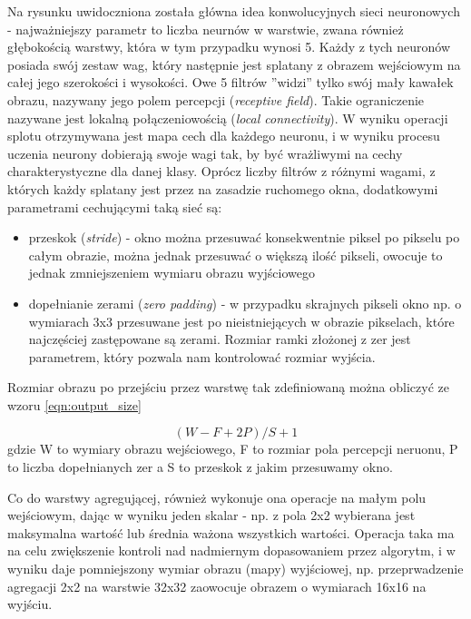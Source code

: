 Na rysunku uwidoczniona została główna idea konwolucyjnych sieci neuronowych - najważniejszy parametr to liczba neurnów w warstwie, zwana również głębokością warstwy, która w tym przypadku wynosi 5.
Każdy z tych neuronów posiada swój zestaw wag, który następnie jest splatany z obrazem wejściowym na całej jego szerokości i wysokości.
Owe 5 filtrów ''widzi'' tylko swój mały kawałek obrazu, nazywany jego polem percepcji (\textit{receptive field}).
Takie ograniczenie nazywane jest lokalną połączeniowością (\textit{local connectivity}).
W wyniku operacji splotu otrzymywana jest mapa cech dla każdego neuronu, i w wyniku procesu uczenia neurony dobierają swoje wagi tak, by być wrażliwymi na cechy charakterystyczne dla danej klasy.
Oprócz liczby filtrów z różnymi wagami, z których każdy splatany jest przez na zasadzie ruchomego okna, dodatkowymi parametrami cechującymi taką sieć są:

\begin{itemize}
	\item przeskok (\textit{stride}) - okno można przesuwać konsekwentnie piksel po pikselu po całym obrazie, można jednak przesuwać o większą ilość pikseli, owocuje to jednak zmniejszeniem wymiaru obrazu wyjściowego
	\item dopełnianie zerami (\textit{zero padding}) - w przypadku skrajnych pikseli okno np. o wymiarach 3x3 przesuwane jest po nieistniejących w obrazie pikselach, które najczęściej zastępowane są zerami.
	 			Rozmiar ramki złożonej z zer jest parametrem, który pozwala nam kontrolować rozmiar wyjścia.
\end{itemize}

Rozmiar obrazu po przejściu przez warstwę tak zdefiniowaną można obliczyć ze wzoru \ref{eqn:output_size}

\begin{equation}\label{eqn:output_size}
(W - F + 2P)/S + 1
\end{equation}
gdzie W to wymiary obrazu wejściowego, F to rozmiar pola percepcji neruonu, P to liczba dopełnianych zer a S to przeskok z jakim przesuwamy okno.

Co do warstwy agregującej, również wykonuje ona operacje na małym polu wejściowym, dając w wyniku jeden skalar - np. z pola 2x2 wybierana jest maksymalna wartość lub średnia ważona wszystkich wartości.
Operacja taka ma na celu zwiększenie kontroli nad nadmiernym dopasowaniem przez algorytm, i w wyniku daje pomniejszony wymiar obrazu (mapy) wyjściowej, np. przeprwadzenie agregacji 2x2 na warstwie 32x32 zaowocuje obrazem o wymiarach 16x16 na wyjściu.

